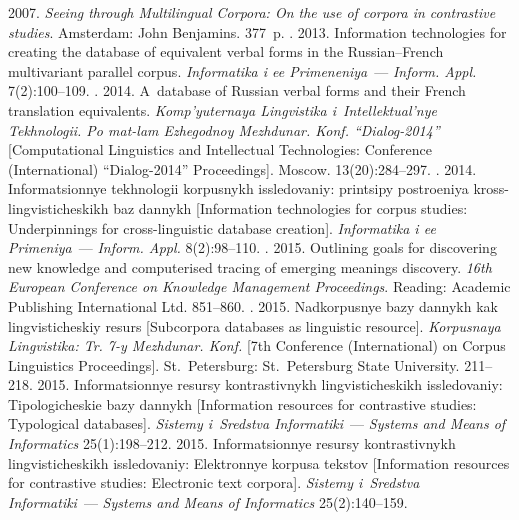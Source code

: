 \begin{multicols}{2}
{\small\frenchspacing
 {%
 \begin{thebibliography}{99}
 2007. \textit{Seeing through Multilingual Corpora: On the use 
of corpora in contrastive studies}. Amsterdam: John Benjamins. 377~p.
. 
2013. Information technologies for creating the database of equivalent verbal forms 
in the Russian--French multivariant parallel corpus. \textit{Informatika i ee 
Primeneniya}~--- \textit{Inform. Appl.} 7(2):100--109.
. 2014. A~database 
of Russian verbal forms and their French translation equivalents. 
\textit{Komp'yuternaya Lingvistika i~Intellektual'nye Tekhnologii. Po mat-lam 
Ezhegodnoy Mezhdunar. Konf. ``Dialog-2014''} [Computational Linguistics and 
Intellectual Technologies: Conference (International) ``Dialog-2014'' 
Proceedings]. Moscow. 13(20):284--297.
. 2014. Informatsionnye tekhnologii 
korpusnykh issledovaniy: printsipy postroeniya kross-lingvisticheskikh baz dannykh 
[Information technologies for corpus studies: Underpinnings for cross-linguistic 
database creation]. \textit{Informatika i ee Primeniya}~--- \textit{Inform. Appl.} 
8(2):98--110.
. 2015. Outlining goals for discovering new 
knowledge and computerised tracing of emerging meanings discovery. \textit{16th 
European Conference on Knowledge Management Proceedings}. Reading: 
Academic Publishing International Ltd. 851--860.
. 2015. Nadkorpusnye bazy dannykh kak lingvisticheskiy resurs 
[Subcorpora databases as linguistic resource]. \textit{Korpusnaya Lingvistika: Tr.  
7-y Mezhdunar. Konf.} [7th Conference (International) on Corpus Linguistics 
Proceedings]. St.\ Petersburg: St.\ Petersburg State University. 211--218.
 2015. Informatsionnye resursy kontrastivnykh 
lingvisticheskikh issledovaniy: Tipologicheskie bazy dannykh [Information 
resources for contrastive studies: Typological databases]. \textit{Sistemy i~Sredstva 
Informatiki}~--- \textit{Systems and Means of Informatics} 25(1):198--212.
 2015. Informatsionnye resursy kontrastivnykh 
lingvisticheskikh issledovaniy: Elektronnye korpusa tekstov [Information resources 
for contrastive studies: Electronic text corpora]. \textit{Sistemy i~Sredstva 
Informatiki}~--- \textit{Systems and Means of Informatics} 25(2):140--159.


\end{thebibliography}}}
\end{multicols}
